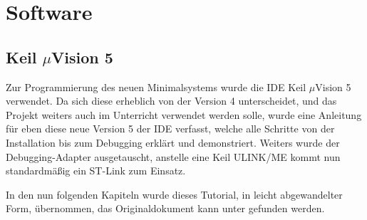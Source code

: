 \newcommand*{\uVision}{$\mu$Vision}

\clearpage
{}
\section{Software}
\label{sec:software}

\subsection{Keil \uVision{} 5}
\label{sec:uvision-5}

Zur Programmierung des neuen \gls{Minimalsystem}s wurde die \gls{IDE} Keil \uVision{} 5 verwendet. Da sich diese erheblich von der Version 4 unterscheidet, und das Projekt weiters auch im Unterricht verwendet werden solle, wurde eine Anleitung für eben diese neue Version 5 der \gls{IDE} verfasst, welche alle Schritte von der Installation bis zum \gls{Debugging} erklärt und demonstriert. Weiters wurde der \gls{Debugging}-Adapter ausgetauscht, anstelle eine \gls{Keil} ULINK/ME kommt nun standardmäßig ein ST-Link zum Einsatz.

In den nun folgenden Kapiteln wurde dieses Tutorial, in leicht abgewandelter Form, übernommen, das Originaldokument kann unter \cite{doku:tutorial} gefunden werden.

